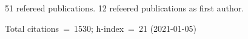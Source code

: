 51 refereed publications. 12 refeered publications as first author.

Total citations~=~1530; h-index~=~21 (2021-01-05)
